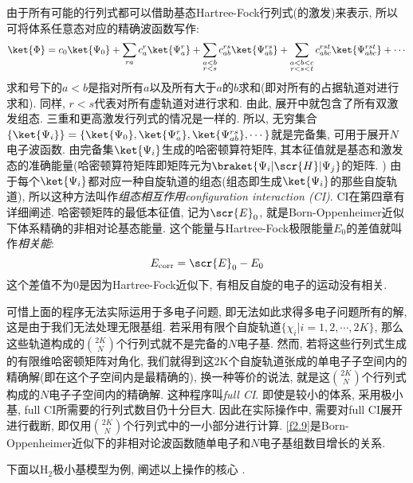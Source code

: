 由于所有可能的行列式都可以借助基态Hartree-Fock行列式(的激发)来表示, 
所以可将体系任意态对应的精确波函数写作:
\begin{equation}
\ket{\Phi}=c_0\ket{\Psi_0}+\sum_{ra}c_a^r\ket{\Psi_a^r}+\sum_{\substack{a<b\\r<s}}c_{ab}^{rs}\ket{\Psi_{ab}^{rs}}+\sum_{\substack{a<b<c\\r<s<t}}c_{abc}^{rst}\ket{\Psi_{abc}^{rst}}+\cdots
\end{equation}
求和号下的$a<b$是指对所有$a$以及所有大于$a$的$b$求和(即对所有的占据轨道对进行求和). 
同样, 
$r<s$代表对所有虚轨道对进行求和. 
由此, 
展开中就包含了所有双激发组态. 
三重和更高激发行列式的情况是一样的. 
所以, 
无穷集合$\{\ket{\Psi_i} \}=\{\ket{\Psi_0}, \ket{\Psi_a^r}, \ket{\Psi_{ab}^{rs}}, \cdots \}$就是完备集, 
可用于展开$N$电子波函数. 
由完备集$\ket{\Psi_i}$生成的哈密顿算符矩阵, 
其本征值就是基态和激发态的准确能量(哈密顿算符矩阵即矩阵元为$\braket{\Psi_i|\scr{H}|\Psi_j}$的矩阵.
) 由于每个$\ket{\Psi_i}$都对应一种自旋轨道的组态(组态即生成$\ket{\Psi_i}$的那些自旋轨道), 
所以这种方法叫作\emph{组态相互作用configuration interaction ({CI\rm})}. 
CI在第四章有详细阐述. 
哈密顿矩阵的最低本征值, 
记为$\scr{E}_0$, 
就是Born-Oppenheimer近似下体系精确的非相对论基态能量. 
这个能量与Hartree-Fock极限能量$E_0$的差值就叫作\emph{相关能}:
\begin{equation}
E_{\mathrm{corr}}=\scr{E}_0-E_0
\end{equation} 
这个差值不为0是因为Hartree-Fock近似下, 
有相反自旋的电子的运动没有相关.


可惜上面的程序无法实际运用于多电子问题, 
即无法如此求得多电子问题所有的解, 
这是由于我们无法处理无限基组. 
若采用有限个自旋轨道$\{\chi_i|i=1,2,\cdots,2K \}$, 
那么这些轨道构成的$\binom{2K}{N}$个行列式就不是完备的$N$电子基. 
然而, 
若将这些行列式生成的有限维哈密顿矩阵对角化, 
我们就得到这2K个自旋轨道张成的单电子子空间内的精确解(即在这个子空间内是最精确的), 
换一种等价的说法, 
就是这$\binom{2K}{N}$个行列式构成的$N$电子子空间内的精确解. 
这种程序叫\emph{full CI}. 
即使是较小的体系, 
采用极小基, 
full CI所需要的行列式数目仍十分巨大. 
因此在实际操作中, 
需要对full CI展开进行截断, 
即仅用$\binom{2K}{N}$个行列式中的一小部分进行计算. 
\autoref{f2.9}是Born-Oppenheimer近似下的非相对论波函数随单电子和$N$电子基组数目增长的关系.



下面以$\text{H}_2$极小基模型为例, 
阐述以上操作的核心 .

